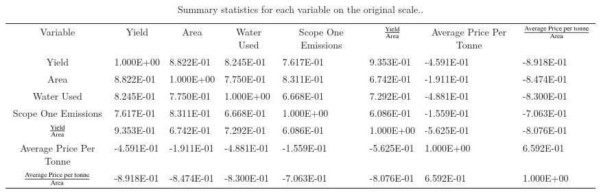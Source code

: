 \documentclass[review,12pt,authoryear]{elsarticle}
\begin{document}
\begin{linenumbers}
    \begin{table}[]
      \caption{Summary statistics for each variable on the original scale..}
      \label{tab:tab5}
      \begin{tabular}{clllllll}
      Variable &
        \multicolumn{1}{c}{Yield} &
        \multicolumn{1}{c}{Area} &
        \multicolumn{1}{c}{Water Used} &
        \multicolumn{1}{c}{Scope One Emissions} &
        \multicolumn{1}{c}{$\textrm{Yield}\over\textrm{Area}$} &
        \multicolumn{1}{c}{Average Price Per Tonne} &
        \multicolumn{1}{c}{${\textrm{Average Price per tonne}\over\textrm{Area}}$} \\
      Yield                                              & 1.000E+00  & 8.822E-01  & 8.245E-01  & 7.617E-01  & 9.353E-01  & -4.591E-01 & -8.918E-01 \\
      Area                                               & 8.822E-01  & 1.000E+00  & 7.750E-01  & 8.311E-01  & 6.742E-01  & -1.911E-01 & -8.474E-01 \\
      Water Used                                         & 8.245E-01  & 7.750E-01  & 1.000E+00  & 6.668E-01  & 7.292E-01  & -4.881E-01 & -8.300E-01 \\
      Scope One Emissions                                & 7.617E-01  & 8.311E-01  & 6.668E-01  & 1.000E+00  & 6.086E-01  & -1.559E-01 & -7.063E-01 \\
      $\textrm{Yield}\over\textrm{Area}$                     & 9.353E-01  & 6.742E-01  & 7.292E-01  & 6.086E-01  & 1.000E+00  & -5.625E-01 & -8.076E-01 \\
      Average Price Per Tonne                            & -4.591E-01 & -1.911E-01 & -4.881E-01 & -1.559E-01 & -5.625E-01 & 1.000E+00  & 6.592E-01  \\
      ${\textrm{Average Price per tonne}\over\textrm{Area}}$ & -8.918E-01 & -8.474E-01 & -8.300E-01 & -7.063E-01 & -8.076E-01 & 6.592E-01  & 1.000E+00 
      \end{tabular}
      \end{table}

\end{linenumbers}
\end{document}
